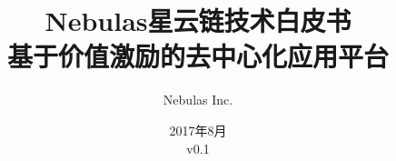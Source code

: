 \documentclass[11.5pt]{article}
\begin{document}
\renewcommand{\contentsname}{目录}
\renewcommand{\abstractname}{摘要}
\renewcommand{\refname}{参考文献}
\renewcommand{\nomname}{术语表}
\renewcommand{\figurename}{图}
\renewcommand{\baselinestretch}{1.5}
\renewcommand{\appendixname}{附录}

\title{
	Nebulas星云链技术白皮书 \\
	\large 基于价值激励的去中心化应用平台}
\author{Nebulas Inc.}
\date{2017年8月\\v0.1}

\maketitle

\newpage

\tableofcontents

\printnomenclature


\newpage

\newpage

\newpage

\newpage

\newpage

\newpage

\newpage

\newpage

\newpage

\printbibliography

\begin{appendices}

\end{appendices}

%
\end{document}
